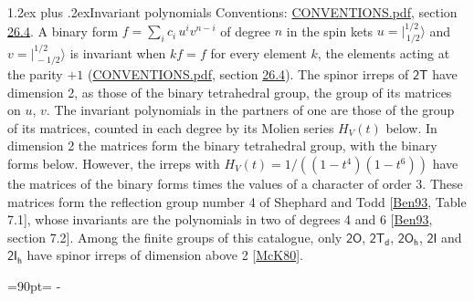 \documentclass[10pt,a4paper]{article}
\makeatletter
\renewcommand\section{\@startsection{section}{1}{\z@}{-3ex plus -1ex minus -.2ex}%
  {1.2ex plus .2ex}{\normalfont\large\sffamily\bfseries\color{parttitle}}}
\newcommand{\needspace}[1]{\par\penalty-100\begingroup\dimen0=#1\relax\dimen2=\pagegoal
  \advance\dimen2-\pagetotal\ifdim\dimen0>\dimen2\relax\ifdim\dimen2>0pt\vfil\break\fi\fi
  \endgroup}
\numberwithin{equation}{section}
\newcommand{\grp}[1]{\mathsf{#1}}
\newcommand{\jm}[2]{\bigl\lvert{}^{#1}_{\,#2}\bigr\rangle}
\makeatother
\begin{document}
\section{Invariant polynomials}\label{s:invariants}
Conventions: \href{../../CONVENTIONS.pdf}{CONVENTIONS.pdf}, section \href{../../CONVENTIONS.pdf\#conv.26.4}{26.4}.
\leavevmode\label{n:local.binary.form}A binary form $f = \sum_i c_i\, u^i v^{n-i}$ of degree $n$ in the spin kets $u = \jm{1/2}{1/2}$ and $v = \jm{1/2}{-1/2}$ is invariant when $k f = f$ for every element $k$, the elements acting at the parity $+1$ (\href{../../CONVENTIONS.pdf}{CONVENTIONS.pdf}, section \href{../../CONVENTIONS.pdf\#conv.26.4}{26.4}).
The spinor irreps of $\grp{2T}$ have dimension 2, as those of the binary tetrahedral group, the group of its matrices on $u$, $v$. \label{n:function.hilbert}The invariant polynomials in the partners of one are those of the group of its matrices, counted in each degree by its Molien series $H_V(t)$ below. In dimension 2 the matrices form the binary tetrahedral group, with the binary forms below. However, the irreps with $H_V(t) = 1/((1 - t^{4})(1 - t^{6}))$ have the matrices of the binary forms times the values of a character of order 3. These matrices form the reflection group number 4 of Shephard and Todd [\href{../../../REFERENCES.pdf\#ref.Ben93}{Ben93}, Table 7.1], whose invariants are the polynomials in two of degrees 4 and 6 [\href{../../../REFERENCES.pdf\#ref.Ben93}{Ben93}, section 7.2]. Among the finite groups of this catalogue, only $\grp{2O}$, $\grp{2T_{d}}$, $\grp{2O_{h}}$, $\grp{2I}$ and $\grp{2I_{h}}$ have spinor irreps of dimension above 2 [\href{../../../REFERENCES.pdf\#ref.McK80}{McK80}].
\needspace{90pt}
\end{document}
